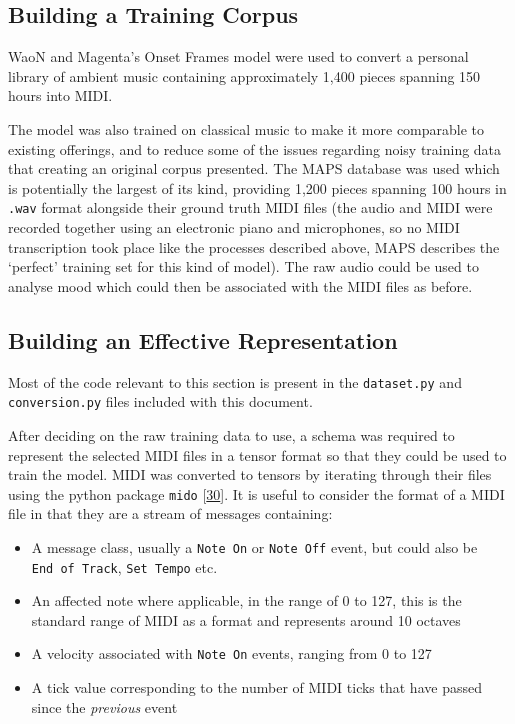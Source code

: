 \documentclass[12pt,]{article}
\providecommand{\tightlist}{%
  \setlength{\itemsep}{0pt}\setlength{\parskip}{0pt}}
\begin{document}
\hypertarget{building-a-training-corpus}{%
\subsection{Building a Training
Corpus}\label{building-a-training-corpus}}

WaoN and Magenta's Onset Frames model were used to convert a personal
library of ambient music containing approximately 1,400 pieces spanning
150 hours into MIDI.

The model was also trained on classical music to make it more comparable
to existing offerings, and to reduce some of the issues regarding noisy
training data that creating an original corpus presented. The MAPS
database was used which is potentially the largest of its kind,
providing 1,200 pieces spanning 100 hours in \texttt{.wav} format
alongside their ground truth MIDI files (the audio and MIDI were
recorded together using an electronic piano and microphones, so no MIDI
transcription took place like the processes described above, MAPS
describes the `perfect' training set for this kind of model). The raw
audio could be used to analyse mood which could then be associated with
the MIDI files as before.

\hypertarget{building-an-effective-representation}{%
\subsection{Building an Effective
Representation}\label{building-an-effective-representation}}

Most of the code relevant to this section is present in the
\texttt{dataset.py} and \texttt{conversion.py} files included with this
document.

After deciding on the raw training data to use, a schema was required to
represent the selected MIDI files in a tensor format so that they could
be used to train the model. MIDI was converted to tensors by iterating
through their files using the python package \texttt{mido}
{[}\protect\hyperlink{ref-mido}{30}{]}. It is useful to consider the
format of a MIDI file in that they are a stream of messages containing:

\begin{itemize}
\tightlist
\item
  A message class, usually a \texttt{Note\ On} or \texttt{Note\ Off}
  event, but could also be \texttt{End\ of\ Track}, \texttt{Set\ Tempo}
  etc.
\item
  An affected note where applicable, in the range of 0 to 127, this is
  the standard range of MIDI as a format and represents around 10
  octaves
\item
  A velocity associated with \texttt{Note\ On} events, ranging from 0 to
  127
\item
  A tick value corresponding to the number of MIDI ticks that have
  passed since the \emph{previous} event
\end{itemize}
\end{document}
